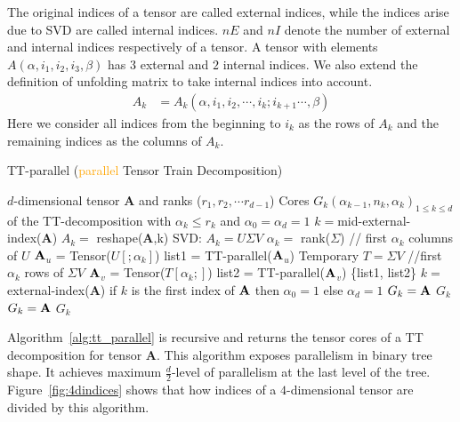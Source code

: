 \documentclass[runningheads]{llncs}
\newcommand{\tensor}[1]{\cal\textbf{#1}\xspace}
\begin{document}
The original indices of a tensor are called external indices, while the indices arise due to SVD are called internal indices. $nE$ and $nI$ denote the number of external and internal indices respectively of a tensor. A tensor with elements $A(\alpha, i_1, i_2, i_3, \beta)$ has $3$ external and $2$ internal indices. We also extend the definition of unfolding matrix to take internal indices into account.
\begin{align*}
A_k &= A_k(\alpha, i_1, i_2, \cdots, i_k; i_{k+1}\cdots, \beta)
\end{align*}
Here we consider all indices from the beginning to $i_k$ as the rows of $A_k$ and the remaining indices as the columns of $A_k$.
\begin{algorithm}[htb]
	\caption{\label{alg:tt_parallel}TT-parallel (\textcolor{orange}{parallel} Tensor Train Decomposition)}
	\begin{algorithmic}[1]
		\REQUIRE $d$-dimensional tensor \tensor{A} and ranks ($r_1, r_2,\cdots r_{d-1}$) 
		\ENSURE Cores $G_k(\alpha_{k-1}, n_k, \alpha_k) _{1\le k\le d}$ of the TT-decomposition with $\alpha_k \le r_k$ and $\alpha_0 = \alpha_d=1$
		\IF{$nE(\tensor{A})> $$1$} 
		\STATE $k=$mid-external-index(\tensor{A}) 
		\STATE $A_k =$ reshape(\tensor{A},k)
		\STATE SVD: $A_k = U\Sigma V$
		\STATE $\alpha_k=$ rank($\Sigma$)
		\STATE // first $\alpha_k$ columns of $U$
		\STATE $\tensor{A}$$_u$ = Tensor($U[;\alpha_k]$)
		\STATE list1 = TT-parallel($\tensor{A}$$_u$)
		\STATE Temporary $T =\Sigma V$
		\STATE //first $\alpha_k$ rows of $\Sigma V$
		\STATE $\tensor{A}$$_v$ = Tensor($T[\alpha_k;]$)
		\STATE list2 = TT-parallel($\tensor{A}$$_v$)
		\RETURN \{list1, list2\}
		\ELSIF{$nE(\tensor{A})==$$1$ and $nI(\tensor{A})==$$1$} 
		\STATE $k=$ external-index(\tensor{A})
		\STATE if $k$ is the first index of $\tensor{A}$ then $\alpha_0=1$ else $\alpha_d = 1$
		\STATE $G_k = \tensor{A}$
		\RETURN $G_k$
		\ELSE 
		\STATE $G_k = \tensor{A}$
		\RETURN $G_k$
		\ENDIF
	\end{algorithmic}
\end{algorithm} 

Algorithm~\ref{alg:tt_parallel} is recursive and returns the tensor cores of a TT decomposition for tensor \tensor{A}.  This algorithm exposes parallelism in binary tree shape. It achieves maximum $\frac{d}{2}$-level of parallelism at the last level of the tree. Figure~\ref{fig:4dindices} shows that how indices of a $4$-dimensional tensor are divided by this algorithm.
\end{document}
